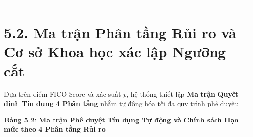 \documentclass[
  13pt,
  a4paper,
]{report}
\begin{document}
\begin{center}\rule{0.5\linewidth}{0.5pt}\end{center}

\section{5.2. Ma trận Phân tầng Rủi ro và Cơ sở Khoa học xác lập Ngưỡng
cắt}\label{ma-trux1eadn-phuxe2n-tux1ea7ng-rux1ee7i-ro-vuxe0-cux1a1-sux1edf-khoa-hux1ecdc-xuxe1c-lux1eadp-ngux1b0ux1ee1ng-cux1eaft}

Dựa trên điểm FICO Score và xác suất \(p\), hệ thống thiết lập
\textbf{Ma trận Quyết định Tín dụng 4 Phân tầng} nhằm tự động hóa tối đa
quy trình phê duyệt:

\textbf{Bảng 5.2: Ma trận Phê duyệt Tín dụng Tự động và Chính sách Hạn
mức theo 4 Phân tầng Rủi ro}
\end{document}
